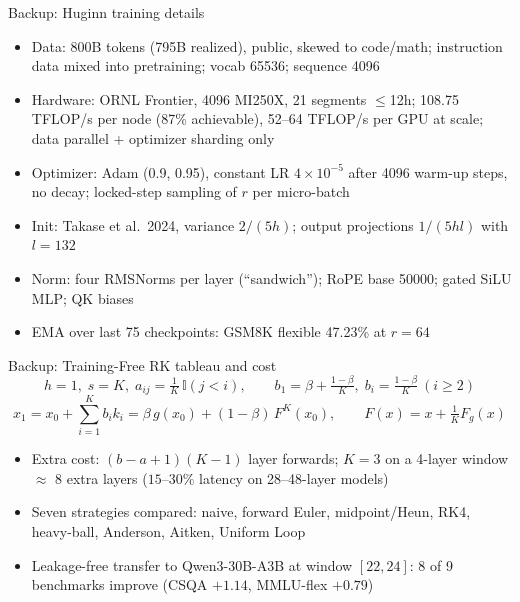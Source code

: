 \documentclass[aspectratio=169,10pt]{beamer}
\begin{document}
\begin{frame}{Backup: Huginn training details}
  \begin{itemize}
    \item Data: 800B tokens (795B realized), public, skewed to code/math; instruction data mixed into pretraining; vocab 65536; sequence 4096
    \item Hardware: ORNL Frontier, 4096 MI250X, 21 segments $\le$12h; 108.75 TFLOP/s per node (87\% achievable), 52--64 TFLOP/s per GPU at scale; data parallel + optimizer sharding only
    \item Optimizer: Adam (0.9, 0.95), constant LR $4\times10^{-5}$ after 4096 warm-up steps, no decay; locked-step sampling of $r$ per micro-batch
    \item Init: Takase et al.\ 2024, variance $2/(5h)$; output projections $1/(5hl)$ with $l = 132$
    \item Norm: four RMSNorms per layer (``sandwich''); RoPE base 50000; gated SiLU MLP; QK biases
    \item EMA over last 75 checkpoints: GSM8K flexible 47.23\% at $r{=}64$
  \end{itemize}
\end{frame}

\begin{frame}{Backup: Training-Free RK tableau and cost}
  \[ h=1,\; s=K,\; a_{ij} = \tfrac{1}{K}\,\mathbb{I}(j<i),\qquad b_1 = \beta + \tfrac{1-\beta}{K},\; b_i = \tfrac{1-\beta}{K}\ (i\ge2) \]
  \[ x_1 = x_0 + \sum_{i=1}^{K} b_i k_i = \beta\, g(x_0) + (1-\beta)\, F^{K}(x_0),\qquad F(x) = x + \tfrac{1}{K}F_g(x) \]
  \begin{itemize}
    \item Extra cost: $(b-a+1)(K-1)$ layer forwards; $K{=}3$ on a 4-layer window $\approx$ 8 extra layers ($15$--$30\%$ latency on 28--48-layer models)
    \item Seven strategies compared: naive, forward Euler, midpoint/Heun, RK4, heavy-ball, Anderson, Aitken, Uniform Loop
    \item Leakage-free transfer to Qwen3-30B-A3B at window $[22,24]$: 8 of 9 benchmarks improve (CSQA $+1.14$, MMLU-flex $+0.79$)
  \end{itemize}
\end{frame}
\end{document}
